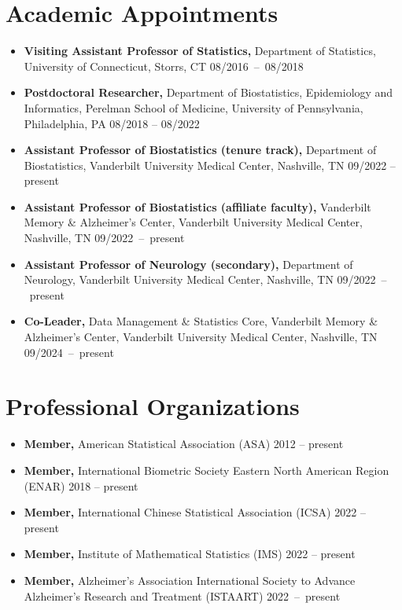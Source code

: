 \documentclass[12pt]{article}
\begin{document}
	\section*{Academic Appointments}
	\begin{itemize}
		\item {\bf Visiting Assistant Professor of Statistics,} 
		Department of Statistics, University of Connecticut, Storrs, 
		CT \hfill \mbox{08/2016 -- 08/2018} 
		\item {\bf Postdoctoral Researcher,} Department of 
		Biostatistics, Epidemiology and Informatics, Perelman School of Medicine, University of Pennsylvania, Philadelphia, PA \hfill 08/2018 -- 08/2022
		\item {\bf Assistant Professor of Biostatistics (tenure track),} Department of Biostatistics, Vanderbilt University Medical Center, Nashville, TN \hfill 09/2022 -- present
		\item {\bf Assistant Professor of Biostatistics (affiliate 
		faculty),} Vanderbilt Memory \& Alzheimer's Center, 
		Vanderbilt University Medical Center, Nashville, TN \hfill 
		\mbox{09/2022 -- present}
		\item {\bf Assistant Professor of Neurology (secondary),} 
		Department of Neurology, Vanderbilt University Medical 
		Center, Nashville, TN \hfill \mbox{09/2022 -- present}
		\item {\bf Co-Leader,} Data Management \& Statistics 
		Core, Vanderbilt Memory \& Alzheimer's Center, Vanderbilt 
		University Medical Center, Nashville, TN \hfill \mbox{09/2024 
		-- present}
	\end{itemize}

		
	\section*{Professional Organizations}
	\begin{itemize}
		\item {\bf Member,} American Statistical Association (ASA) \hfill 2012 -- present
		\item {\bf Member,} International Biometric Society Eastern North American Region (ENAR) \hfill 2018 -- present
		\item {\bf Member,} International Chinese Statistical Association (ICSA) \hfill 2022 -- present
		\item {\bf Member,} Institute of Mathematical Statistics (IMS) \hfill 2022 -- present
		\item {\bf Member,} Alzheimer's Association International 
		Society to Advance Alzheimer's Research and Treatment 
		(ISTAART) \hfill \mbox{2022 -- present}
	\end{itemize}
\end{document}
